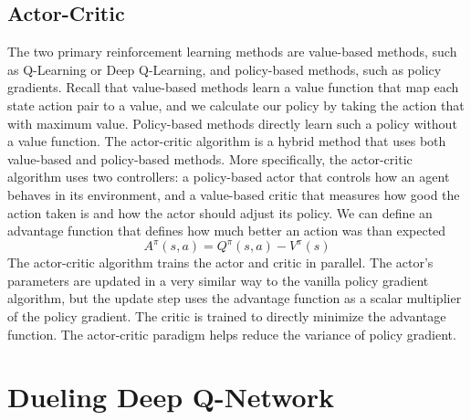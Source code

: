 \documentclass[journal,onecolumn]{IEEEtran}
\begin{document}
\subsection{Actor-Critic} The two primary reinforcement learning methods are value-based methods, such as Q-Learning or Deep Q-Learning, and policy-based methods, such as policy gradients. Recall that value-based methods learn a value function that map each state action pair to a value, and we calculate our policy by taking the action that with maximum value. Policy-based methods directly learn such a policy without a value function.  The actor-critic algorithm is a hybrid method that uses both value-based and policy-based methods. More specifically, the actor-critic algorithm uses two controllers: a policy-based actor that controls how an agent behaves in its environment, and a value-based critic that measures how good the action taken is and how the actor should adjust its policy. We can define an advantage function that defines how much better an action was than expected
\[
A^{\pi} (s,a)=Q^{\pi} (s,a)-V^{\pi} (s)
\]
The actor-critic algorithm trains the actor and critic in parallel. The actor’s parameters are updated in a very similar way to the vanilla policy gradient algorithm, but the update step uses the advantage function as a scalar multiplier of the policy gradient. The critic is trained to directly minimize the advantage function. The actor-critic paradigm helps reduce the variance of policy gradient. 
\section{ Dueling Deep Q-Network}
\end{document}

